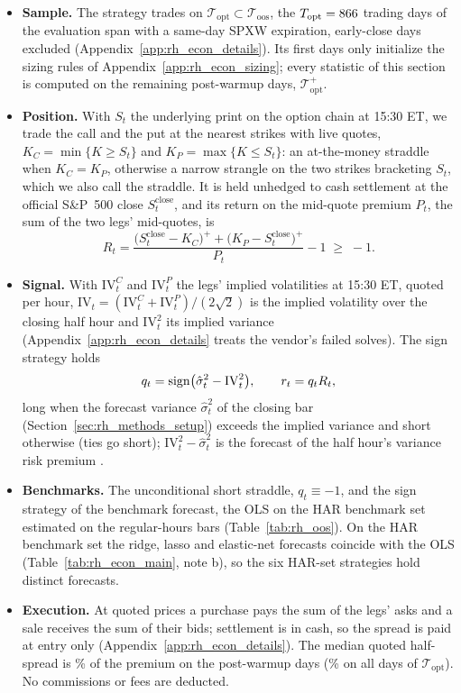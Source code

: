\begin{itemize}
\item \textbf{Sample.} The strategy trades on $\mathcal T_{\mathrm{opt}} \subset \mathcal T_{\mathrm{oos}}$, the
  $T_{\mathrm{opt}} = 866$ trading days of the evaluation span with a same-day SPXW expiration, early-close days
  excluded (Appendix~\ref{app:rh_econ_details}). Its first \rheSzWarmup{} days only initialize the sizing rules of
  Appendix~\ref{app:rh_econ_sizing}; every statistic of this section is computed on the remaining \rheSzDays{}
  post-warmup days, $\mathcal T_{\mathrm{opt}}^{+}$.
\item \textbf{Position.} With $S_t$ the underlying print on the option chain at 15:30 ET, we trade the call and the
  put at the nearest strikes with live quotes, $K_C = \min\{K \ge S_t\}$ and $K_P = \max\{K \le S_t\}$: an
  at-the-money straddle when $K_C = K_P$, otherwise a narrow strangle on the two strikes bracketing $S_t$, which we
  also call the straddle. It is held unhedged to cash settlement at the official S\&P~500 close
  $S^{\mathrm{close}}_t$, and its return on the mid-quote premium $P_t$, the sum of the two legs' mid-quotes, is
  \[
    R_t = \frac{\bigl(S^{\mathrm{close}}_t - K_C\bigr)^+ + \bigl(K_P - S^{\mathrm{close}}_t\bigr)^+}{P_t} - 1
      \;\ge\; -1 .
  \]
\item \textbf{Signal.} With $\mathrm{IV}^C_t$ and $\mathrm{IV}^P_t$ the legs' implied volatilities at 15:30 ET, quoted
  per hour, $\mathrm{IV}_t = (\mathrm{IV}^C_t + \mathrm{IV}^P_t)/(2\sqrt2)$ is the implied volatility over the closing
  half hour and $\mathrm{IV}_t^2$ its implied variance (Appendix~\ref{app:rh_econ_details} treats the vendor's
  failed solves). The sign strategy holds
  \[
    q_t = \operatorname{sign}\bigl(\hat\sigma^2_t - \mathrm{IV}_t^2\bigr), \qquad r_t = q_t R_t ,
  \]
  long when the forecast variance $\hat\sigma^2_t$ of the closing bar (Section~\ref{sec:rh_methods_setup}) exceeds
  the implied variance and short otherwise (ties go short); $\mathrm{IV}_t^2 - \hat\sigma^2_t$ is the forecast of the
  half hour's variance risk premium \citep{CarrWu2009,BollerslevTauchenZhou2009}.
\item \textbf{Benchmarks.} The unconditional short straddle, $q_t \equiv -1$, and the sign strategy of the benchmark
  forecast, the OLS on the HAR benchmark set estimated on the \rhePoolNBars{} regular-hours bars
  (Table~\ref{tab:rh_oos}). On the HAR benchmark set the ridge, lasso and elastic-net forecasts coincide with
  the OLS (Table~\ref{tab:rh_econ_main}, note b), so the six HAR-set strategies hold \rhemHarDistinctWord{} distinct
  forecasts.
\item \textbf{Execution.} At quoted prices a purchase pays the sum of the legs' asks and a sale receives the sum of
  their bids; settlement is in cash, so the spread is paid at entry only (Appendix~\ref{app:rh_econ_details}). The
  median quoted half-spread is \rhemHalfSpreadMed\% of the premium on the \rheSzDays{} post-warmup days
  (\rhemHalfSpreadMedAll\% on all \cmNdays{} days of $\mathcal T_{\mathrm{opt}}$). No commissions or fees are
  deducted.
\end{itemize}

